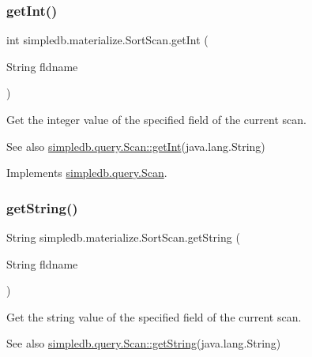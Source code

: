 \mbox{\label{classsimpledb_1_1materialize_1_1SortScan_a2a0cdce171742d1f7b29d15ba4413621}} 
\subsubsection{\texorpdfstring{get\+Int()}{getInt()}}
{\footnotesize\ttfamily int simpledb.\+materialize.\+Sort\+Scan.\+get\+Int (\begin{DoxyParamCaption}\item[{String}]{fldname }\end{DoxyParamCaption})\hspace{0.3cm}{\ttfamily [inline]}}

Get the integer value of the specified field of the current scan. \begin{DoxySeeAlso}{See also}
\hyperlink{interfacesimpledb_1_1query_1_1Scan_a2e064555e16240115167b5d42d2b3d19}{simpledb.\+query.\+Scan\+::get\+Int}(java.\+lang.\+String) 
\end{DoxySeeAlso}


Implements \hyperlink{interfacesimpledb_1_1query_1_1Scan_a2e064555e16240115167b5d42d2b3d19}{simpledb.\+query.\+Scan}.

\mbox{\label{classsimpledb_1_1materialize_1_1SortScan_a4e8f52b556a029c86480d969f06bb1e0}} 
\subsubsection{\texorpdfstring{get\+String()}{getString()}}
{\footnotesize\ttfamily String simpledb.\+materialize.\+Sort\+Scan.\+get\+String (\begin{DoxyParamCaption}\item[{String}]{fldname }\end{DoxyParamCaption})\hspace{0.3cm}{\ttfamily [inline]}}

Get the string value of the specified field of the current scan. \begin{DoxySeeAlso}{See also}
\hyperlink{interfacesimpledb_1_1query_1_1Scan_a922e219fee53ecfa6163525f9e3ef222}{simpledb.\+query.\+Scan\+::get\+String}(java.\+lang.\+String) 
\end{DoxySeeAlso}


